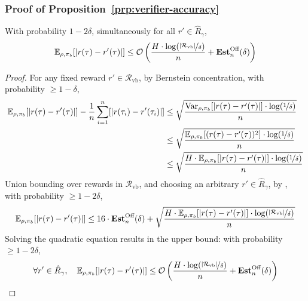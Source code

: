 \subsubsection{Proof of Proposition~\ref{prp:verifier-accuracy}}

\begin{lemma} \label{lemma:gb}
With probability $1-2\delta$, simultaneously for all $r' \in \hat{R}_{\gamma}$,
\begin{align*}
    \mathbb{E}_{\rho,\pi_b} [|r(\tau) - r'(\tau)|] \le {\mathcal{O}} \left( \frac{H \cdot \log (\nicefrac{|\mathcal{R}_{\text{vb}}|}{\delta})}{n} + \textbf{Est}^{\text{Off}}_n (\delta) \right)
\end{align*}
\end{lemma}
\begin{proof}
For any fixed reward $r' \in \mathcal{R}_{\text{vb}}$, by Bernstein concentration, with probability $\ge 1 - \delta$,
\begin{align*}
    \mathbb{E}_{\rho,\pi_b} [|r(\tau) - r'(\tau)|] - \frac{1}{n} \sum_{i=1}^n [|r(\tau_i) - r' (\tau_i)|] &\le \sqrt{\frac{\mathrm{Var}_{\rho,\pi_b} [ |r(\tau) - r'(\tau)|] \cdot \log (\nicefrac{1}{\delta})}{n}} \\
    &\le \sqrt{\frac{\mathbb{E}_{\rho,\pi_b} [ (r(\tau) - r'(\tau))^2] \cdot \log (\nicefrac{1}{\delta})}{n}} \\
    &\le \sqrt{\frac{H \cdot \mathbb{E}_{\rho,\pi_b} [ |r(\tau) - r'(\tau)|] \cdot \log (\nicefrac{1}{\delta})}{n}}
\end{align*}
Union bounding over rewards in $\mathcal{R}_{\text{vb}}$, and choosing an arbitrary $r' \in \hat{R}_\gamma$, by , with probability $\ge 1-2\delta$,
\begin{align*}
    \mathbb{E}_{\rho,\pi_b} [|r(\tau) - r'(\tau)|] \le 16 \cdot \textbf{Est}^{\text{Off}}_n (\delta) + \sqrt{\frac{H \cdot \mathbb{E}_{\rho,\pi_b} [ |r(\tau) - r'(\tau)|] \cdot \log (\nicefrac{|\mathcal{R}_{\text{vb}}|}{\delta})}{n}}
\end{align*}
Solving the quadratic equation results in the upper bound: with probability $\ge 1 - 2\delta$,
\begin{align*}
    \forall r' \in \hat{R}_\gamma,\quad \mathbb{E}_{\rho,\pi_b} [|r(\tau) - r'(\tau)|] \le {\mathcal{O}} \left( \frac{H \cdot \log (\nicefrac{|\mathcal{R}_{\text{vb}}|}{\delta})}{n} + \textbf{Est}^{\text{Off}}_n (\delta) \right)
\end{align*}

\end{proof}

















